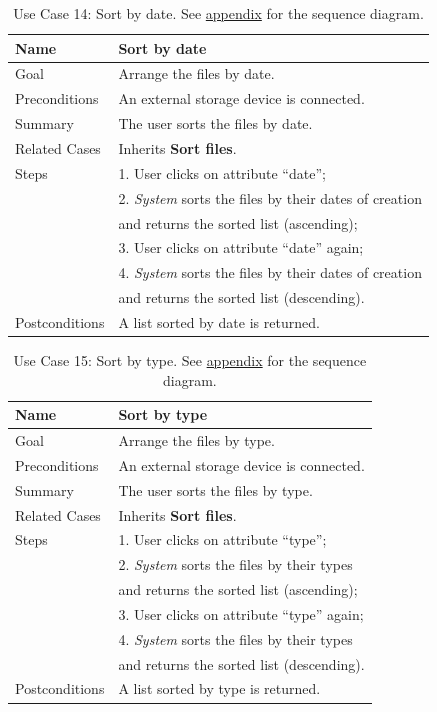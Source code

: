 \begin{table}[h!]
\centering
\begin{tabular}{|l|l|}
\hline
Name & Sort by date\\ \hline
Goal & Arrange the files by date.\\ \hline
Preconditions & An external storage device is connected. \\ \hline
Summary & The user sorts the files by date.\\ \hline
Related Cases & Inherits \textbf{Sort files}. \\ \hline
Steps &  1. User clicks on attribute ``date''; \\
      &  2. \textit{System} sorts the files by their dates of creation
      \\ & and returns the sorted list (ascending); \\
      &  3. User clicks on attribute ``date'' again; \\
      &  4. \textit{System} sorts the files by their dates of creation
      \\ & and returns the sorted list (descending).
        \\ \hline
Postconditions & A list sorted by date is returned.
\\ \hline
\end{tabular}
\caption{Use Case 14: Sort by date. See \hyperref[fig:req_seq7]{appendix} for the sequence diagram.}
\label{tab:UC14}
\end{table}

\begin{table}[h!]
\centering
\begin{tabular}{|l|l|}
\hline
Name & Sort by type\\ \hline
Goal & Arrange the files by type.\\ \hline
Preconditions & An external storage device is connected. \\ \hline
Summary & The user sorts the files by type.\\ \hline
Related Cases & Inherits \textbf{Sort files}. \\ \hline
Steps &  1. User clicks on attribute ``type''; \\
      &  2. \textit{System} sorts the files by their types 
      \\ & and returns the sorted list (ascending); \\
      &  3. User clicks on attribute ``type'' again; \\
      &  4. \textit{System} sorts the files by their types
      \\ & and returns the sorted list (descending).
        \\ \hline
Postconditions & A list sorted by type is returned.
\\ \hline
\end{tabular}
\caption{Use Case 15: Sort by type. See \hyperref[fig:req_seq7]{appendix} for the sequence diagram.}
\label{tab:UC15}
\end{table}

